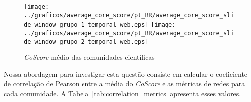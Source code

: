 
\begin{figure}[!htb]
  \begin{center}
    \texttt{[image: ../graficos/average\_core\_score/pt\_BR/average\_core\_score\_slide\_window\_grupo\_1\_temporal\_web.eps]}
    \texttt{[image: ../graficos/average\_core\_score/pt\_BR/average\_core\_score\_slide\_window\_grupo\_2\_temporal\_web.eps]}
  \end{center}
  \caption{\textit{CoScore} médio das comunidades científicas}
  \label{fig:average_core_score}
\end{figure}


Nossa abordagem para investigar esta questão consiste em calcular o coeficiente de correlação de Pearson entre a média do
\textit{CoScore} e as métricas de redes para cada comunidade. A Tabela~\ref{tab:correlation_metrics} apresenta esses valores.

